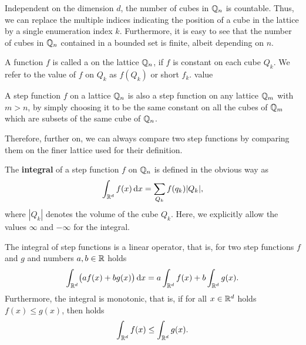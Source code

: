 \begin{note}
  Independent on the dimension $d$, the number of cubes in $\mathbb Q_n$ is
  countable. Thus, we can replace the multiple indices indicating the
  position of a cube in the lattice by a single enumeration index
  $k$. Furthermore, it is easy to see that the number of cubes in
  $\mathbb Q_n$ contained in a bounded set is finite, albeit depending on $n$.
\end{note}

\begin{definition}
  A function $f$ is called a  on the lattice
  $\mathbb Q_n$, if $f$ is constant on each cube $Q_k$. We refer to the value
  of $f$ on $Q_k$ as $f(Q_k)$ or short $f_k$.
  value 
\end{definition}

\begin{note}
  A step function $f$ on a lattice $\mathbb Q_n$ is also a step function on
  any lattice $\mathbb Q_m$ with $m>n$, by simply choosing it to be the same
  constant on all the cubes of $\mathbb Q_m$ which are subsets of the same
  cube of $\mathbb Q_n$.
  
  Therefore, further on, we can always compare two step functions by
  comparing them on the finer lattice used for their definition.
\end{note}


\begin{definition}
  The \textbf{integral} of a step function $f$ on $\mathbb Q_n$ is
  defined in the obvious way as
  \begin{gather*}
    \int_{\mathbb R^d} f(x) \,\mathrm{d} x = \sum_{Q_k} f(q_k) |Q_k|,
  \end{gather*}
  where $|Q_k|$ denotes the volume of the cube $Q_k$.
  Here, we explicitly allow the values $\infty$ and $-\infty$ for the integral.
\end{definition}

\begin{lemma}
  The integral of step functions is a linear operator,
  that is, for two step functions $f$ and $g$ and numbers $a,b\in
  \mathbb R$ holds
  \begin{gather*}
    \int_{\mathbb R^d}\bigl(a f(x)+b g(x)\bigr) \,\mathrm{d} x
    = a\int_{\mathbb R^d} f(x) + b \int_{\mathbb R^d} g(x).
  \end{gather*}
  Furthermore, the integral is monotonic, that is, if for all $x\in
  \mathbb R^d$ holds $f(x) \le g(x)$, then holds
  \begin{gather*}
    \int_{\mathbb R^d} f(x) \le \int_{\mathbb R^d} g(x).
  \end{gather*}
\end{lemma}

